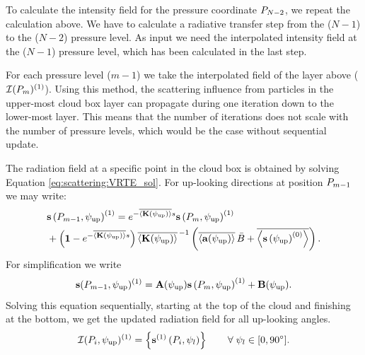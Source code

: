 To calculate the intensity field for the pressure coordinate
$P_{N-2}$, we repeat the calculation above. We have to calculate a
radiative transfer step from the ($N-1$) to the ($N-2$) pressure level.
As input we need the interpolated intensity field at the ($N-1$)
pressure level, which has been calculated in the last step.
  
For each pressure level ($m-1$) we take the interpolated field of the
layer above (${\mathcal I}(P_{m})^{(1)}$).  Using this method, the
scattering influence from particles in the upper-most cloud box
layer can propagate during one iteration down to the lower-most layer.
This means that the number of iterations does not scale with the
number of pressure levels, which would be the case without sequential
update.
  
The radiation field at a specific point in the cloud box is obtained by
solving Equation \ref{eq:scattering:VRTE_sol}. For up-looking directions at position
$P_{m-1}$ we may write:
\begin{eqnarray}
 & {\bf s}\left( P_{m-1},\psi_\mathrm{up} \right) ^{(1)}  =  
  e^{-\overline{\left\langle {\bf K} (\psi_\mathrm{up}) \right\rangle} s} 
  {\bf s}\left( P_m,\psi_\mathrm{up} \right)^{(1)}  \nonumber \\ &+
  \left( \mathbf{1} -  e^{-\overline{\left\langle {\bf K} (\psi_\mathrm{up}) \right\rangle} s}\right) 
  \overline{\left\langle {\bf K}(\psi_\mathrm{up}) \right\rangle}^{\,-1} 
  \left( \overline{\left\langle {\bf a} (\psi_\mathrm{up}) \right\rangle}\,  
    \bar{B} +
    \overline{\left\langle {\bf s}\left(\psi_\mathrm{up} \right)^{(0)} \right\rangle }
  \right).
\end{eqnarray}
For simplification we write
\begin{equation}
  {\bf s} ( P_{m-1},\psi_\mathrm{up})^{(1)} = 
  \mathbf{A}(\psi_\mathrm{up})  {\bf s}\left( P_m,\psi_\mathrm{up} \right)^{(1)} 
  + \mathbf{B} ( \psi_\mathrm{up}).
\end{equation}
Solving this equation sequentially, starting at the top of the cloud
and finishing at the bottom, we get the updated radiation field for
all up-looking angles.
\begin{equation} {\mathcal I}(P_i, \psi_\mathrm{up})^{(1)} =
  \left\{ {\bf s}^{(1)} \left( P_i,\psi_l \right) \right\} \qquad
  \forall \; \psi_{l} \in [0, 90^\circ].
\end{equation}

